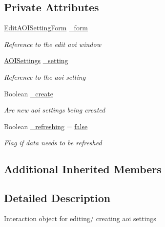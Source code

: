 \subsection*{Private Attributes}
\begin{DoxyCompactItemize}
\item 
\hyperlink{class_web_analyzer_1_1_u_i_1_1_edit_a_o_i_setting_form}{Edit\+A\+O\+I\+Setting\+Form} \hyperlink{class_web_analyzer_1_1_u_i_1_1_interaction_objects_1_1_a_o_i_setting_control_ac5dbfb65b9f423acacde7281bd52dfa2}{\+\_\+form}
\begin{DoxyCompactList}\small\item\em Reference to the edit aoi window \end{DoxyCompactList}\item 
\hyperlink{class_web_analyzer_1_1_models_1_1_settings_model_1_1_a_o_i_settings}{A\+O\+I\+Settings} \hyperlink{class_web_analyzer_1_1_u_i_1_1_interaction_objects_1_1_a_o_i_setting_control_a99ecb89643396f52452299c28f5836f6}{\+\_\+setting}
\begin{DoxyCompactList}\small\item\em Reference to the aoi setting \end{DoxyCompactList}\item 
Boolean \hyperlink{class_web_analyzer_1_1_u_i_1_1_interaction_objects_1_1_a_o_i_setting_control_ae07b626b4714865d3312bff419277857}{\+\_\+create}
\begin{DoxyCompactList}\small\item\em Are new aoi settings being created \end{DoxyCompactList}\item 
Boolean \hyperlink{class_web_analyzer_1_1_u_i_1_1_interaction_objects_1_1_a_o_i_setting_control_a84039727f675ce1ff9e96e21ff3a9be4}{\+\_\+refreshing} = \hyperlink{_u_i_2_h_t_m_l_resources_2js_2src_2export_8js_ae6c865df784842196d411c1466b01686}{false}
\begin{DoxyCompactList}\small\item\em Flag if data needs to be refreshed \end{DoxyCompactList}\end{DoxyCompactItemize}
\subsection*{Additional Inherited Members}


\subsection{Detailed Description}
Interaction object for editing/ creating aoi settings 



